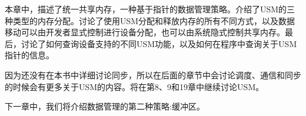 本章中，描述了统一共享内存，一种基于指针的数据管理策略。介绍了USM的三种类型的内存分配。讨论了使用USM分配和释放内存的所有不同方式，以及数据移动可以由开发者显式控制进行设备分配，也可以由系统隐式控制共享内存。最后，讨论了如何查询设备支持的不同USM功能，以及如何在程序中查询关于USM指针的信息。\par

因为还没有在本书中详细讨论同步，所以在后面的章节中会讨论调度、通信和同步的时候会有更多关于USM的内容。将在第8、9和19章中继续讨论USM。\par

下一章中，我们将介绍数据管理的第二种策略:缓冲区。\par

\newpage